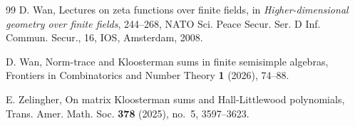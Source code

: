 \documentclass[11pt]{amsart}
\theoremstyle{remark}
\begin{document}
\begin{thebibliography}{99}
D. Wan, Lectures on zeta functions over finite fields, in {\it Higher-dimensional geometry over finite fields}, 244--268, NATO Sci. Peace Secur. Ser. D Inf. Commun. Secur., 16, IOS, Amsterdam, 2008.

D. Wan, Norm-trace and Kloosterman sums in finite semisimple algebras, Frontiers in Combinatorics and Number Theory \textbf{1} (2026), 74--88.

E. Zelingher, On matrix Kloosterman sums and Hall-Littlewood polynomials, Trans. Amer. Math. Soc. {\bf 378} (2025), no.~5, 3597--3623.
\end{thebibliography}
\end{document}
